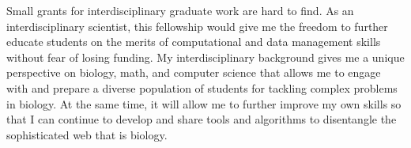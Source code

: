\documentclass[12pt]{article}
\begin{document}
Small grants for interdisciplinary graduate work are hard to find.
As an interdisciplinary scientist, this fellowship would give me the freedom to further educate students on the merits of computational and data management skills without fear of losing funding. My interdisciplinary background gives me a unique perspective on biology, math, and computer science that allows me to engage with and prepare a diverse population of students for tackling complex problems in biology.
At the same time, it will allow me to further improve my own skills so that I can continue to develop and share tools and algorithms to disentangle the sophisticated web that is biology.
\end{document}
